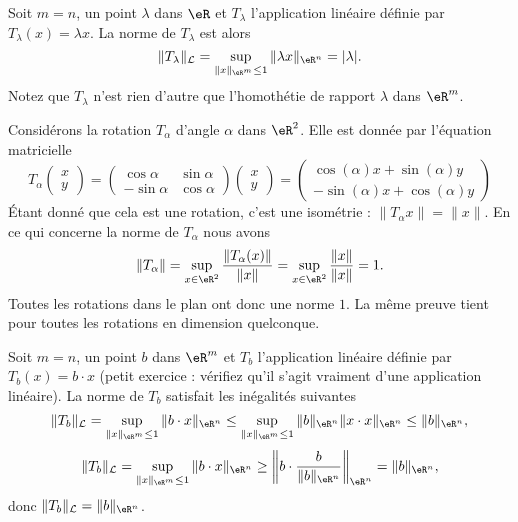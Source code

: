 \begin{example}
	Soit $m=n$, un point $\lambda$ dans $\eR$ et $T_{\lambda}$ l'application linéaire définie par $T_{\lambda}(x)=\lambda x$. La norme de $T_{\lambda}$ est alors
\[
\|T_{\lambda}\|_{\mathcal{L}}=\sup_{\|x\|_{\eR^m}\leq 1}\|\lambda x\|_{\eR^n}= |\lambda|.
\]
Notez que $T_{\lambda}$ n'est rien d'autre que l'homothétie de rapport $\lambda$ dans $\eR^m$.
\end{example}

\begin{example}
	Considérons la rotation $T_{\alpha}$ d'angle $\alpha$ dans $\eR^2$. Elle est donnée par l'équation matricielle
	\begin{equation}
		T_{\alpha}\begin{pmatrix}
			x	\\
			y
		\end{pmatrix}=\begin{pmatrix}
			\cos\alpha	&	\sin\alpha	\\
			-\sin\alpha	&	\cos\alpha
		\end{pmatrix}\begin{pmatrix}
			x	\\
			y
		\end{pmatrix}=\begin{pmatrix}
			\cos(\alpha)x+\sin(\alpha)y	\\
			-\sin(\alpha)x+\cos(\alpha)y
		\end{pmatrix}
	\end{equation}
	Étant donné que cela est une rotation, c'est une isométrie : $\| T_{\alpha}x \|=\| x \|$. En ce qui concerne la norme de $T_{\alpha}$ nous avons
	\begin{equation}
		\| T_{\alpha} \|=\sup_{x\in\eR^2}\frac{ \| T_{\alpha}(x) \| }{ \| x \| }=\sup_{x\in\eR^2}\frac{ \| x \| }{ \| x \| }=1.
	\end{equation}
	Toutes les rotations dans le plan ont donc une norme $1$. La même preuve tient pour toutes les rotations en dimension quelconque.
\end{example}


\begin{example}
  Soit $m=n$, un point $b$ dans $\eR^m$ et $T_b$ l'application linéaire définie par $T_b(x)=b\cdot x$ (petit exercice : vérifiez qu'il s'agit vraiment d'une application linéaire).  La norme de $T_b$ satisfait les inégalités suivantes
 \[
\|T_b\|_{\mathcal{L}}=\sup_{\|x\|_{\eR^m}\leq 1}\|b\cdot x\|_{\eR^n}\leq \sup_{\|x\|_{\eR^m}\leq 1}\|b \|_{\eR^n}\|x\cdot x\|_{\eR^n}\leq\|b \|_{\eR^n},
\]
\[
\|T_b\|_{\mathcal{L}}=\sup_{\|x\|_{\eR^m}\leq 1}\|b\cdot x\|_{\eR^n}\geq \left\|b\cdot \frac{b}{\|b \|_{\eR^n}}\right\|_{\eR^n}=\|b \|_{\eR^n},
\]
donc $\|T_b\|_{\mathcal{L}}=\|b \|_{\eR^n}$.
\end{example}

